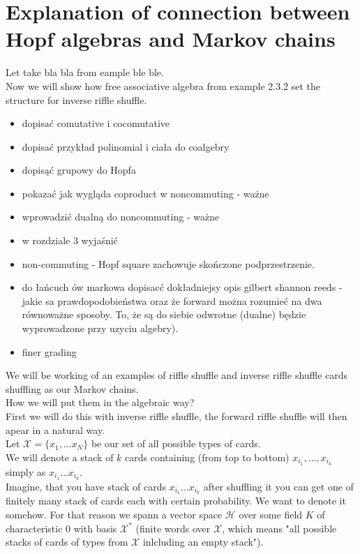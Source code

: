 \documentclass[a4paper]{article}
\begin{document}
\section{Explanation of connection between Hopf algebras and Markov chains}
Let take bla bla from eample ble ble. \\
Now we will show how free associative algebra from example 2.3.2 set the structure for inverse riffle shuffle.
\begin{itemize}
\item dopisać comutative i cocomutative
\item dopisać przykład polinomial i ciała do coalgebry
\item dopisąć grupowy do Hopfa
\item pokazać jak wygląda coproduct w noncommuting - ważne
\item wprowadzić dualną do noncommuting - ważne
\item w rozdziale 3 wyjaśnić 
\item non-commuting - Hopf square zachowuje skończone podprzestrzenie.
\item do łańcuch ów markowa dopisacć dokładniejsy opis gilbert shannon reeds - jakie sa prawdopodobieństwa 
oraz że forward można rozumieć na dwa równoważne sposoby. To, że są do siebie odwrotne (dualne) będzie 
wyprowadzone przy uzyciu algebry).
\item finer grading
\end{itemize}
We will be working of an examples of riffle shuffle and inverse riffle shuffle cards shuffling as 
our Markov chains. \\
How we will put them in the algebraic way? \\
First we will do this with inverse riffle shuffle, the forward riffle shuffle will then apear in a natural 
way. \\
Let $\mathcal{X} = \{x_1, \dots x_N\}$ be our set of all possible types of cards. \\
We will denote a stack of $k$ cards containing (from top to bottom) $x_{i_1}, \dots, x_{i_k}$ simply as 
$x_{i_1}\dots x_{i_k}$. \\
Imagine, that you have stack of cards $x_{i_1}\dots x_{i_k}$ after shuffling it
you can get one of finitely many stack of cards each with certain probability. We want to denote it somehow. 
For that reason we spann a vector space $\mathcal{H}$ over some field $K$ of characteristic 0 
with basis $\mathcal{X}^*$ (finite words over $\mathcal{X}$, which means "all possible stacks 
of cards of types from $\mathcal{X}$ inlcluding an empty stack"). \\
\end{document}
